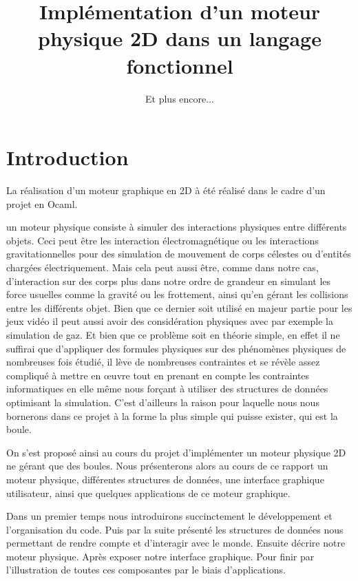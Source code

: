 \documentclass[a4paper]{scrartcl}
\title{Implémentation d'un moteur physique 2D dans un langage fonctionnel}
\subtitle{Et plus encore...}
\begin{document}
\maketitle

\tableofcontents

\newpage

\section*{Introduction}
La réalisation d'un moteur graphique en 2D à été réalisé dans le cadre d'un projet en Ocaml.

un moteur physique consiste à simuler des interactions physiques entre différents objets. Ceci peut être les interaction électromagnétique ou les interactions gravitationnelles pour des simulation de mouvement de corps célestes ou d'entités chargées électriquement. Mais cela peut aussi être, comme dans notre cas, d'interaction sur des corps plus dans notre ordre de grandeur en simulant les force usuelles comme la gravité ou les frottement, ainsi qu'en gérant les collisions entre les différents objet. Bien que ce dernier soit utilisé en majeur partie pour les jeux vidéo il peut aussi avoir des considération physiques avec par exemple la simulation de gaz. Et bien que ce problème soit en théorie simple, en effet il ne suffirai que d'appliquer des formules physiques sur des phénomènes physiques de nombreuses fois étudié, il lève de nombreuses contraintes et se révèle assez compliqué à mettre en œuvre tout en prenant en compte les contraintes informatiques en elle même nous forçant à utiliser des structures de données optimisant la simulation. C'est d'ailleurs la raison pour laquelle nous nous bornerons dans ce projet à la forme la plus simple qui puisse exister, qui est la boule.

On s'est proposé ainsi au cours du projet d'implémenter un moteur physique 2D ne gérant que des boules. Nous présenterons alors au cours de ce rapport un moteur physique, différentes structures de données, une interface graphique utilisateur, ainsi que quelques applications de ce moteur graphique.

Dans un premier temps nous introduirons succinctement  le développement et l'organisation du code. Puis par la suite présenté les structures de données nous permettant de rendre compte et d'interagir avec le monde. Ensuite décrire notre moteur physique. Après exposer notre interface graphique. Pour finir par l'illustration de toutes ces composantes par le biais d'applications.
\end{document}
